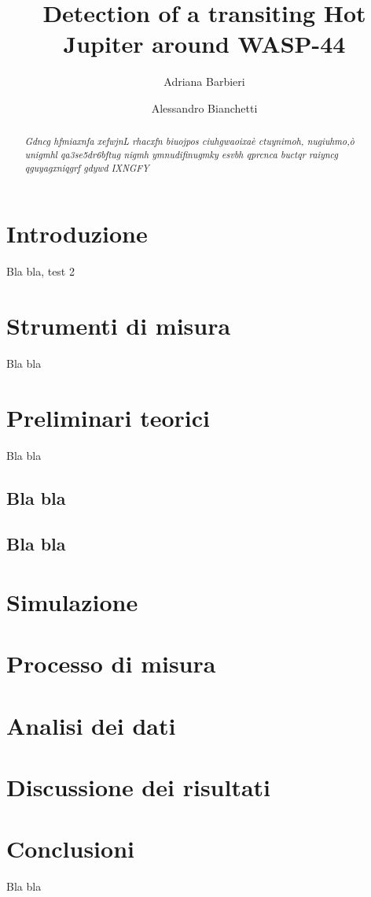 \documentclass[a4paper,11pt,twocolumn]{article}
\title{Detection of a transiting Hot Jupiter around WASP-44}
\author{Adriana Barbieri \and Alessandro Bianchetti}
\begin{document}
\maketitle

\begin{abstract}

\emph{Gdncg hfmiaxnfa   xefwjnL rhacxfn  biuojpos  ciuhgwaoixaè ctuynimoh, nugiuhmo,ò  unigmhl qa3se5dr6bftug nigmh ymnudifinugmky esvbh qprcnca buctqr  raiyncg  qguyagxniqgrf gdywd IXNGFY}

\end{abstract}

\section{Introduzione}

Bla bla, test 2


\section{Strumenti di misura}

Bla bla



\section{Preliminari teorici}

Bla bla




\subsection{Bla bla}



\subsection{Bla bla}



\section{Simulazione}



\section{Processo di misura}






\section{Analisi dei dati}





\section{Discussione dei risultati}



\section{Conclusioni}

Bla bla
\end{document}

